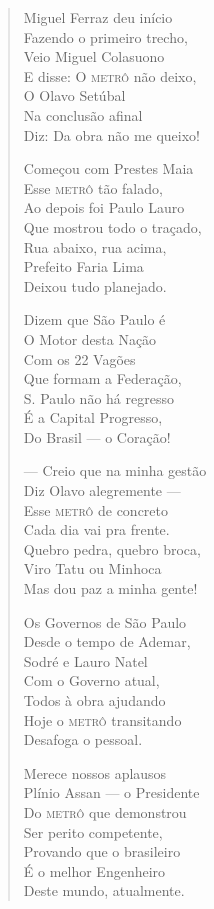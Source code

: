 \begin{verse}
Miguel Ferraz deu início \\
Fazendo o primeiro trecho, \\
Veio Miguel Colasuono \\
E disse: O \textsc{metrô} não deixo, \\
O Olavo Setúbal \\
Na conclusão afinal \\
Diz: Da obra não me queixo! 


Começou com Prestes Maia \\
Esse \textsc{metrô} tão falado, \\
Ao depois foi Paulo Lauro \\
Que mostrou todo o traçado, \\
Rua abaixo, rua acima, \\
Prefeito Faria Lima \\
Deixou tudo planejado. 

Dizem que São Paulo é \\
O Motor desta Nação \\
Com os 22 Vagões \\
Que formam a Federação, \\
S. Paulo não há regresso \\
É a Capital Progresso, \\
Do Brasil ---  o Coração! 

---  Creio que na minha gestão \\
Diz Olavo alegremente --- \\
Esse \textsc{metrô} de concreto \\
Cada dia vai pra frente. \\
Quebro pedra, quebro broca, \\
Viro Tatu ou Minhoca \\
Mas dou paz a minha gente! 

Os Governos de São Paulo \\
Desde o tempo de Ademar, \\
Sodré e Lauro Natel \\
Com o Governo atual, \\
Todos à obra ajudando \\
Hoje o \textsc{metrô} transitando \\
Desafoga o pessoal. 


Merece nossos aplausos \\
Plínio Assan ---  o Presidente \\
Do \textsc{metrô} que demonstrou \\
Ser perito competente, \\
Provando que o brasileiro \\
É o melhor Engenheiro \\
Deste mundo, atualmente. 


\end{verse}
